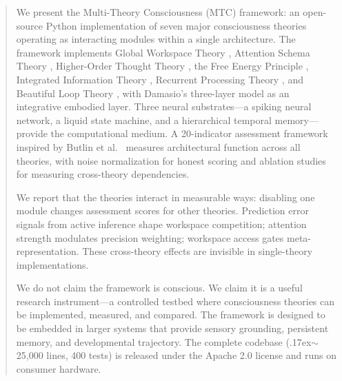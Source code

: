 \begin{abstract}
We present the Multi-Theory Consciousness (MTC) framework: an open-source Python implementation of seven major consciousness theories operating as interacting modules within a single architecture. The framework implements Global Workspace Theory \cite{baars1988}, Attention Schema Theory \cite{graziano2013}, Higher-Order Thought Theory \cite{rosenthal2005}, the Free Energy Principle \cite{friston2010}, Integrated Information Theory \cite{tononi2008}, Recurrent Processing Theory \cite{lamme2006}, and Beautiful Loop Theory \cite{laukkonen2025}, with Damasio's three-layer model as an integrative embodied layer. Three neural substrates---a spiking neural network, a liquid state machine, and a hierarchical temporal memory---provide the computational medium. A 20-indicator assessment framework inspired by Butlin et al.\ \cite{butlin2023} measures architectural function across all theories, with noise normalization for honest scoring and ablation studies for measuring cross-theory dependencies.

We report that the theories interact in measurable ways: disabling one module changes assessment scores for other theories. Prediction error signals from active inference shape workspace competition; attention strength modulates precision weighting; workspace access gates meta-representation. These cross-theory effects are invisible in single-theory implementations.

We do not claim the framework is conscious. We claim it is a useful research instrument---a controlled testbed where consciousness theories can be implemented, measured, and compared. The framework is designed to be embedded in larger systems that provide sensory grounding, persistent memory, and developmental trajectory. The complete codebase ({\raise.17ex\hbox{$\scriptstyle\sim$}}25,000 lines, 400 tests) is released under the Apache 2.0 license and runs on consumer hardware.
\end{abstract}
